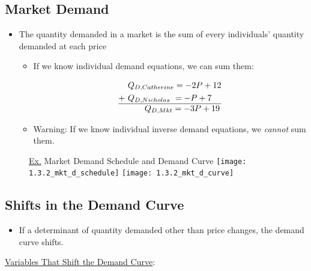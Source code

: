 \subsection{Market Demand}

	\begin{itemize}
	
	\item The quantity demanded in a market is the sum of every individuals' quantity demanded at each price
	
		\begin{itemize}
		
		\item If we know individual demand equations, we can sum them:
		
		\begin{equation*}
			\begin{split}
			&Q_{D,Catherine} = -2P + 12 \\
			+ \ &Q_{D,Nicholas \ } = -P + 7 \\
			\hline
			& \ \ \ \ \ \ Q_{D,Mkt} = -3P + 19
			\end{split}
		\end{equation*}
				
	\item Warning: If we know individual inverse demand equations, we \textit{cannot} sum them.
		
		\end{itemize}
	
	\end{itemize}
	
	\begin{figure}[h]
	\underline{Ex.} Market Demand Schedule and Demand Curve
	\centering
	\texttt{[image: 1.3.2\_mkt\_d\_schedule]}
	\texttt{[image: 1.3.2\_mkt\_d\_curve]}
	\end{figure}
	
\subsection{Shifts in the Demand Curve}

	\begin{itemize}

	\item If a determinant of quantity demanded other than price changes, the demand curve shifts.

	\end{itemize}
	
	\underline{Variables That Shift the Demand Curve}:
	
